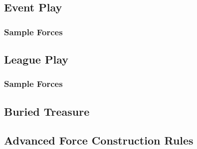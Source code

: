

\subsection{Event Play}
\label{subsec:force_construction_scale_1}



\subsubsection{Sample Forces}
\label{subsec:sample_commands_scale_1}



\newpage

\subsection{League Play}
\label{subsec:force_construction_scale_2}



\subsubsection{Sample Forces}
\label{subsec:sample_commands_scale_2}



\newpage

\subsection{Buried Treasure}



\newpage

\subsection{Advanced Force Construction Rules}





\newpage
